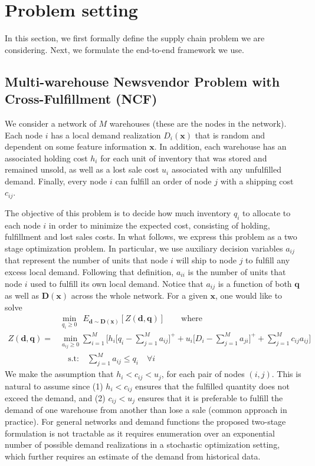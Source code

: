 \documentclass[poms,final,blindrev]{poms1_V1} %
\newcommand{\x}[0]{{\mathbf{x}}}
\newcommand{\q}[0]{{\mathbf{q}}}
\newcommand{\D}[0]{{\mathbf{D}}}
\newcommand{\dd}[0]{{\mathbf{d}}}
\begin{document}
\section{Problem setting}

In this section, we first formally define the supply chain problem we are considering. Next, we formulate the end-to-end framework we use. 

\subsection{Multi-warehouse Newsvendor Problem with Cross-Fulfillment (NCF)}

We consider a network of $M$ warehouses (these are the nodes in the network).  Each node $i$ has a local demand realization $D_i(\x)$ that is random and dependent on some feature information $\x$. In addition, each warehouse has an associated holding cost $h_i$ for each unit of inventory that was stored and remained unsold, as well as a lost sale cost $u_i$ associated with any unfulfilled demand. Finally, every node $i$ can fulfill an order of node $j$ with a shipping cost $c_{ij}$.

The objective of this problem is to decide how much inventory $q_i$ to allocate to each node $i$ in order to minimize the expected cost, consisting of holding, fulfillment and lost sales costs. In what follows, we express this problem as a two stage optimization problem. In particular, we use auxiliary decision variables $a_{ij}$ that represent the number of units that node $i$ will ship to node $j$ to fulfill any excess local demand. Following that definition, $a_{ii}$ is the number of units that node $i$ used to fulfill its own local demand. Notice that $a_{ij}$ is a function of both $\boldsymbol{q}$ as well as $\boldsymbol{D}(\x)$ across the whole network. For a given $\x$, one would like to solve
\begin{equation}
\label{two_stage_og}
\begin{aligned}
&\min_{q_i \geq 0} \ \  E_{\dd \sim \D(\x)}[Z({\dd},{\q})] \qquad \textrm{where} \\  
 Z({\dd},{\q}) = &\min_{a_{ij}\geq 0}
 \sum_{i=1}^{M} \bigg[ h_i \big[ q_i - \sum_{j=1}^{M} a_{ij} \big]^+   +  u_{i} \big[ D_i - \sum_{j=1}^{M}  a_{ji}\big]^+ +  \sum_{j=1}^{M}    c_{ij} a_{ij}
\bigg] \\
& \quad \text{s.t:} \quad  
\sum_{j=1}^{M} a_{ij} \leq  q_i \quad \forall i 
\end{aligned}
\end{equation}
We make the assumption that $h_i < c_{ij} < u_j$, for each pair of nodes $(i,j)$. This is natural to assume since (1) $h_i < c_{ij}$  ensures that the fulfilled quantity does not exceed the demand, and (2) $c_{ij} < u_j$ ensures that it is preferable to fulfill the demand of one warehouse from another than lose a sale (common approach in practice). For general networks and demand functions the proposed two-stage formulation is not tractable as it requires enumeration over an exponential number of possible demand realizations in a stochastic optimization setting, which further requires an estimate of the demand from historical data. 
\end{document}
